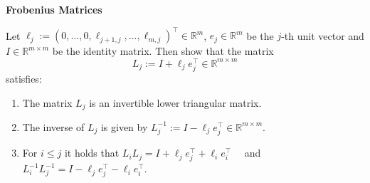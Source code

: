 \textbf{Frobenius Matrices}

Let $\ell_j := (0,\ldots,0,\ell_{j+1,j},\ldots,\ell_{m,j})^\top\in\mathbb{R}^m$, $e_j\in\mathbb{R}^m$ be the $j$-th unit vector and $I \in \mathbb{R}^{m\times m}$ be the identity matrix. Then show that the matrix $$L_j := I + \ell_je_j^\top \in \mathbb{R}^{m\times m}$$ satisfies:
\begin{enumerate}
	\item The matrix $L_j$ is an invertible lower triangular matrix.
	\item The inverse of $L_j$ is given by $L_j^{-1} := I - \ell_je_j^\top \in \mathbb{R}^{m\times m}$.
	\item For $i\leq j$ it holds that $L_iL_j = I + \ell_je_j^\top+ \ell_ie_i^\top$ ~~and~~ $L_i^{-1}L_j^{-1} = I - \ell_je_j^\top- \ell_ie_i^\top$.
\end{enumerate}